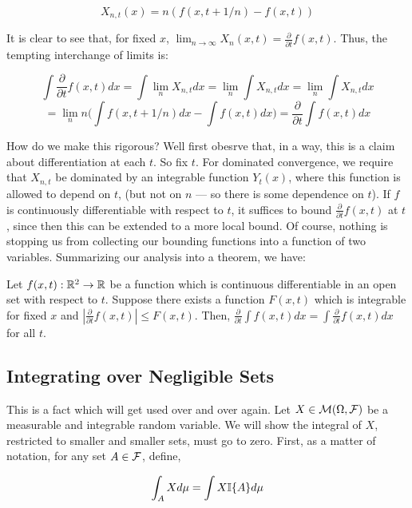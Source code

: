         \[ X_{n,t}(x) = n(f(x,t + 1/n) - f(x,t)) \]

        It is clear to see that, for fixed $x$, $\lim_{n \to \infty}X_n(x,t) = \frac{\partial}{\partial t}f(x,t)$. 
        Thus, the tempting interchange of limits is:

        \[ \int \frac{\partial}{\partial t}f(x,t) dx = \int \lim_n X_{n,t} dx = \lim_n \int X_{n,t} dx = \lim_n \int X_{n,t} dx \]
        \[ = \lim_n n \bigg(\int f(x,t+1/n)dx - \int f(x,t)dx\bigg) = \frac{\partial}{\partial t} \int f(x,t)dx \]

        How do we make this rigorous? Well first obesrve that, in a way, this is a claim about 
        differentiation at each $t$. So fix $t$. For dominated convergence, we require that
        $X_{n,t}$ be dominated by an integrable function $Y_t(x)$, where this function is allowed to depend on 
        $t$, (but not on $n$ — so there is some dependence on $t$). If $f$ is continuously differentiable with respect to 
        $t$, it suffices to bound $\frac{\partial}{\partial t}f(x,t)$ at $t$, since then this can be extended to a more 
        local bound. Of course, nothing is stopping us from collecting our bounding functions into 
        a function of two variables. Summarizing our analysis into a theorem, we have: 

        \begin{theorem}
            Let $f(x,t) : \mathbb R^2 \to \mathbb R$ be a function which is continuous differentiable in an open set with respect to 
            $t$. Suppose there exists a function $F(x,t)$ which is integrable for fixed $x$ and 
            $|\frac{\partial}{\partial t}f(x,t)| \leq F(x,t)$. Then, $\frac{\partial}{\partial t} \int f(x,t)dx =\int \frac{\partial}{\partial t}  f(x,t)dx$ 
            for all $t$.
        \end{theorem}

        \subsection{Integrating over Negligible Sets}

        This is a fact which will get used over and over again. Let $X \in \mathcal M(\Omega, \mathcal F)$ be a measurable and 
        integrable random variable. We will show the integral of $X$, restricted to 
        smaller and smaller sets, must go to zero. First, as a matter of notation, for any 
        set $A \in \mathcal F$, define, 

        \[ \int_A Xd\mu = \int X\mathbb I\{A\}d\mu \]
        
